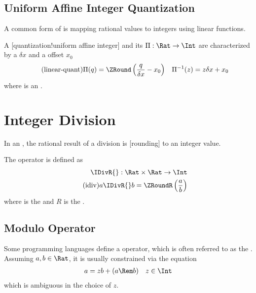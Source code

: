 \subsection{Uniform Affine Integer Quantization}

A common form of  is mapping rational values to integers using linear functions.

\begin{definition}
    A [quantization!uniform affine integer] and its  \(\Pi: \Rat \to \Int\) are characterized by a  \(\delta x\) and a  offset \(x_0\)
    \begin{align*}
        \label{eq:linear_quant}
        \tag{linear-quant}
        \Pi(q) = \ZRound\left(\frac{q}{\delta x} - x_0\right) && \Pi^{-1}(z) = z\delta x + x_0
    \end{align*}
    where \ZRound{} is an .
\end{definition}

\section{Integer Division}

In an , the rational result of a division is [rounding] to an integer value.

\begin{definition}
    The  operator \IDivR{} is defined as
    \begin{align*}
        \IDivR{} : \Rat \times \Rat \to \Int \\
        \label{eq:idiv}
        \tag{idiv}
        a \IDivR{} b = \ZRoundR\left(\frac{a}{b}\right)
    \end{align*}
    where \ZRoundR{} is the  and \(R\) is the .
\end{definition}

\subsection{Modulo Operator}

Some programming languages define a \Rem{} operator, which is often referred to as the .
Assuming \(a, b \in \Rat\), it is usually constrained via the equation
\begin{align*}
    a = zb + (a \Rem b) && z \in \Int
\end{align*}
which is ambiguous in the choice of \(z\).

